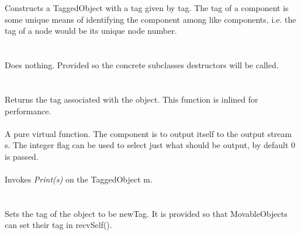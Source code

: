   \\
  \\
Constructs a TaggedObject with a tag given by \p tag. The tag of
a component is some unique means of identifying the component among
like components, i.e. the tag of a node would be its unique node number. \\

  \\
\\
Does nothing. Provided so the concrete subclasses destructors will be
called. \\

  \\
 \\
Returns the tag associated with the object. This function is inlined
for performance.\\

 \\
A pure virtual function. The component is to output itself to the output
stream \p s. The integer \p flag can be used to select just what
should be output, by default $0$ is passed. \\

 \\  
Invokes {\em Print(s)} on the TaggedObject \p m. \\

  \\
 \\
Sets the tag of the object to be \p newTag. It is provided so that
MovableObjects can set their tag in recvSelf().







